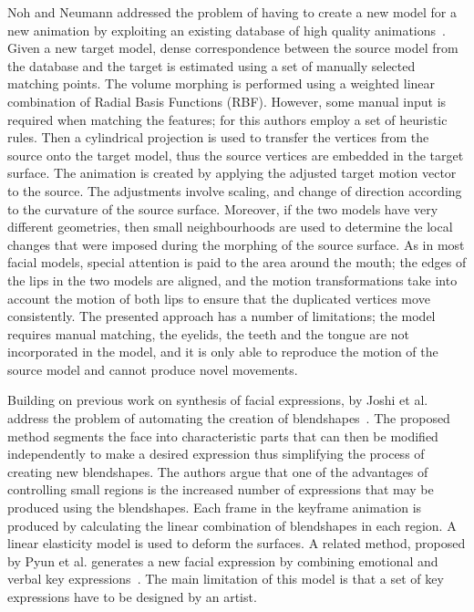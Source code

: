 Noh and Neumann addressed the problem of having to create a new model for a new animation by exploiting an existing database of high quality animations~\cite{Noh:2001}. Given a new target model, dense correspondence between the source model from the database and the target is estimated using a set of manually selected matching points. The volume morphing is performed using a weighted linear combination of Radial Basis Functions (RBF). However, some manual input is required when matching the features; for this authors employ a set of heuristic rules. Then a cylindrical projection is used to transfer the vertices from the source onto the target model, thus the source vertices are embedded in the target surface. The animation is created by applying the adjusted target motion vector to the source. The adjustments involve scaling, and change of direction according to the curvature of the source surface. Moreover, if the two models have very different geometries, then small neighbourhoods are used to determine the local changes that were imposed during the morphing of the source surface. As in most facial models, special attention is paid to the area around the mouth; the edges of the lips in the two models are aligned, and the motion transformations take into account the motion of both lips to ensure that the duplicated vertices move consistently. The presented approach has a number of limitations; the model requires manual matching, the eyelids, the teeth and the tongue are not incorporated in the model, and it is only able to reproduce the motion of the source model and cannot produce novel movements. 

Building on previous work on synthesis of facial expressions, by Joshi et al. address the problem of automating the creation of blendshapes~\cite{Joshi:2003}. The proposed method segments the face into characteristic parts that can then be modified independently to make a desired expression thus simplifying the process of creating new blendshapes. The authors argue that one of the advantages of controlling small regions is the increased number of expressions that may be produced using the blendshapes. Each frame in the keyframe animation is produced by calculating the linear combination of blendshapes in each region. A linear elasticity model is used to deform the surfaces. A related method,  proposed by Pyun et al. generates a new facial expression by combining emotional and verbal key expressions~\cite{Pyun:2003}. The main limitation of this model is that a set of key expressions have to be designed by an artist. 

